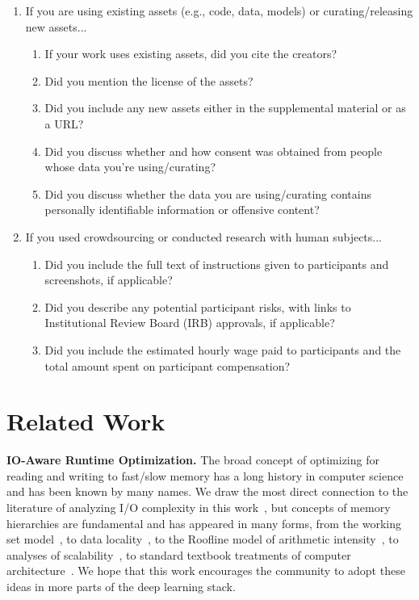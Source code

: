 \documentclass{article}
\begin{document}
{\begin{enumerate}
\item If you are using existing assets (e.g., code, data, models) or curating/releasing new assets...
\begin{enumerate}
  \item If your work uses existing assets, did you cite the creators?
  \item Did you mention the license of the assets?
  \item Did you include any new assets either in the supplemental material or as a URL?
    \answerNo{}
  \item Did you discuss whether and how consent was obtained from people whose data you're using/curating?
    \answerNA{}
  \item Did you discuss whether the data you are using/curating contains personally identifiable information or offensive content?
    \answerNA{}
\end{enumerate}

\item If you used crowdsourcing or conducted research with human subjects...
\begin{enumerate}
  \item Did you include the full text of instructions given to participants and screenshots, if applicable?
    \answerNA{}
  \item Did you describe any potential participant risks, with links to Institutional Review Board (IRB) approvals, if applicable?
    \answerNA{}
  \item Did you include the estimated hourly wage paid to participants and the total amount spent on participant compensation?
    \answerNA{}
\end{enumerate}

\end{enumerate}

\newpage
}

\section{Related Work}
\label{sec:related_work}

\textbf{IO-Aware Runtime Optimization.}
The broad concept of optimizing for reading and writing to fast/slow memory has a long history in computer science and has been known by many names.
We draw the most direct connection to the literature of analyzing I/O complexity in this work~\citep{aggarwal1988input}, but concepts of memory hierarchies are fundamental and has appeared in many forms, from the working set model~\citep{denning1968working}, to data locality~\citep{wolf1991data}, to the Roofline model of arithmetic intensity~\citep{williams2009roofline}, to analyses of scalability~\citep{mcsherry2015scalability}, to standard textbook treatments of computer architecture~\citep{hennessy2003memory}.
We hope that this work encourages the community to adopt these ideas in more parts of the deep learning stack.
\end{document}
